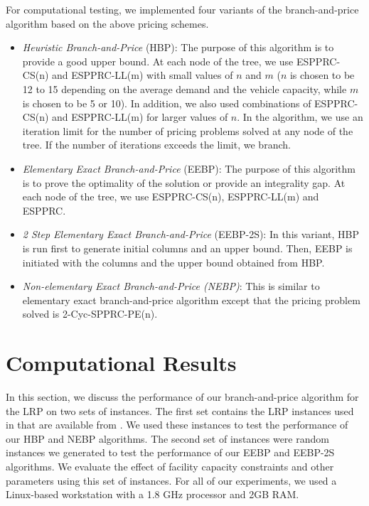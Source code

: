 For computational testing, we implemented four variants of the
branch-and-price algorithm based on the above pricing schemes.
\begin{itemize}
\item \emph{Heuristic Branch-and-Price} (HBP): The purpose of this
algorithm is to provide a good upper bound. At each node of the tree,
we use ESPPRC-CS(n) and ESPPRC-LL(m) with small values of $n$ and
$m$ ($n$ is chosen to be 12 to 15 depending on the average demand and
the vehicle capacity, while $m$ is chosen to be 5 or 10). In addition, we
also used combinations of ESPPRC-CS(n) and ESPPRC-LL(m) for
larger values of $n$. In the algorithm, we use an iteration limit for
the number of pricing problems solved at any node of the tree. If the
number of iterations exceeds the limit, we branch.

\item \emph{Elementary Exact Branch-and-Price} (EEBP): The purpose of
this algorithm is to prove the optimality of the solution or provide
an integrality gap. At each node of the tree,
we use ESPPRC-CS(n), ESPPRC-LL(m) and ESPPRC.

\item \emph{2 Step Elementary Exact Branch-and-Price} (EEBP-2S): In
  this variant, HBP is run first to generate initial columns and an
  upper bound. Then, EEBP is initiated with the columns and the upper
  bound obtained from HBP.

\item \emph{Non-elementary Exact Branch-and-Price (NEBP)}: This is
similar to elementary exact branch-and-price algorithm except that
the pricing problem solved is 2-Cyc-SPPRC-PE(n).

\end{itemize}

\section{Computational Results}
\label{sec:CompR}
In this section, we discuss the performance of our branch-and-price
algorithm for the LRP on two sets of instances. The first set contains the
LRP instances used in \citet{Barreto07} that are available from
\citet{Barreto-data}. 
We used these instances to test the performance of our HBP and NEBP
algorithms. The second set of instances were random instances we
generated to test the performance of our EEBP and EEBP-2S algorithms.
We evaluate the effect of facility capacity constraints and other
parameters using this set of instances. For all of our experiments, we
used a Linux-based workstation with a 1.8 GHz processor and 2GB RAM.

